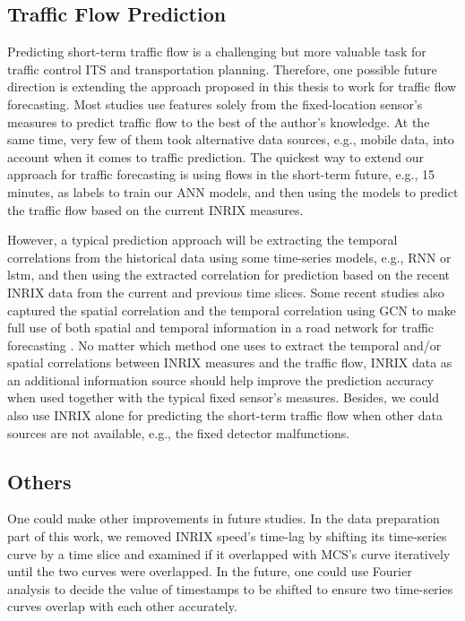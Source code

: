 \documentclass[english]{kththesis}
\begin{document}
\subsection{Traffic Flow Prediction}
Predicting short-term traffic flow is a challenging but more valuable task for traffic control ITS and transportation planning. Therefore, one possible future direction is extending the approach proposed in this thesis to work for traffic flow forecasting. Most studies use features solely from the fixed-location sensor's measures to predict traffic flow to the best of the author's knowledge. At the same time, very few of them took alternative data sources, e.g., mobile data, into account when it comes to traffic prediction. The quickest way to extend our approach for traffic forecasting is using flows in the short-term future, e.g., 15 minutes, as labels to train our ANN models, and then using the models to predict the traffic flow based on the current INRIX measures. 

However, a typical prediction approach will be extracting the temporal correlations from the historical data using some time-series models, e.g., RNN or \gls{lstm}, and then using the extracted correlation for prediction based on the recent INRIX data from the current and previous time slices. Some recent studies also captured the spatial correlation and the temporal correlation using GCN to make full use of both spatial and temporal information in a road network for traffic forecasting \cite{zhang_gcn_prediction}. No matter which method one uses to extract the temporal and/or spatial correlations between INRIX measures and the traffic flow, INRIX data as an additional information source should help improve the prediction accuracy when used together with the typical fixed sensor's measures. Besides, we could also use INRIX alone for predicting the short-term traffic flow when other data sources are not available, e.g., the fixed detector malfunctions.

\subsection{Others}
One could make other improvements in future studies. In the data preparation part of this work, we removed INRIX speed's time-lag by shifting its time-series curve by a time slice and examined if it overlapped with MCS's curve iteratively until the two curves were overlapped. In the future, one could use Fourier analysis to decide the value of timestamps to be shifted to ensure two time-series curves overlap with each other accurately. 
\end{document}
